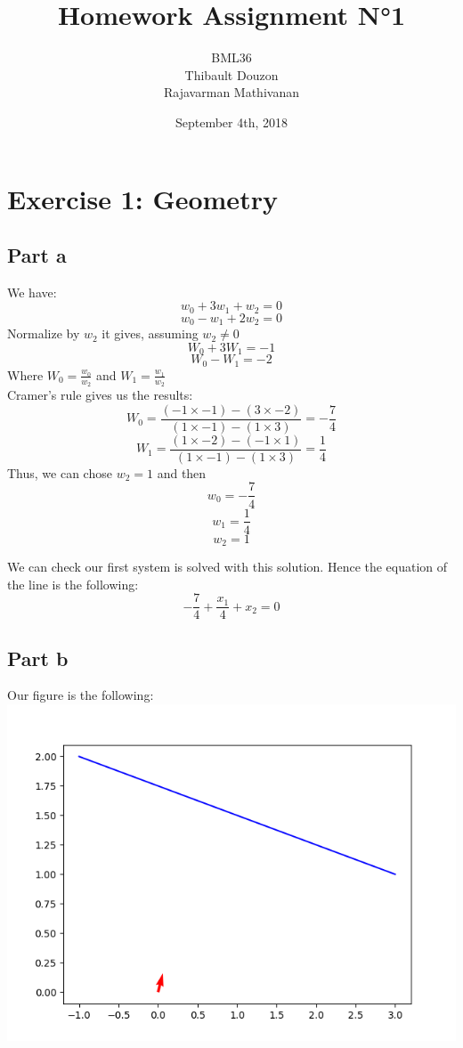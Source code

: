 \documentclass[a4paper, 10pt]{article}
\title{Homework Assignment N°1}
\author{BML36\\Thibault Douzon\\Rajavarman Mathivanan}
\date{September 4th, 2018}
\begin{document}
\maketitle

\pagebreak

\tableofcontents
\pagebreak

\section{Exercise 1: Geometry}
\subsection{Part a}
We have:
$$
w_0 + 3w_1 + w_2 = 0
$$
$$
w_0 - w_1 + 2w_2 = 0
$$
Normalize by $w_2$ it gives, assuming $w_2 \ne 0$
$$
W_0 + 3W_1 = -1
$$
$$
W_0 - W_1 = -2
$$
Where $W_0 = \frac{w_0}{w_2}$ and $W_1 = \frac{w_1}{w_2}$
\\
Cramer's rule gives us the results:
$$
W_0 = \frac{(-1 \times -1) - (3 \times -2)}{(1 \times -1) - (1 \times 3)}
    = -\frac{7}{4}
$$
$$
W_1 = \frac{(1 \times -2) - (-1 \times 1)}{(1 \times -1) - (1 \times 3)}
    = \frac{1}{4}
$$
Thus, we can chose $w_2 = 1$ and then
$$
w_0 = - \frac{7}{4}
$$
$$
w_1 = \frac{1}{4}
$$
$$
w_2 = 1
$$

We can check our first system is solved with this solution.
Hence the equation of the line is the following:
$$
- \frac{7}{4} + \frac{x_1}{4} + x_2 = 0
$$ 

\subsection{Part b}
Our figure is the following:
\\
\includegraphics[scale=0.6]{ex1_partb.png}
\end{document}

